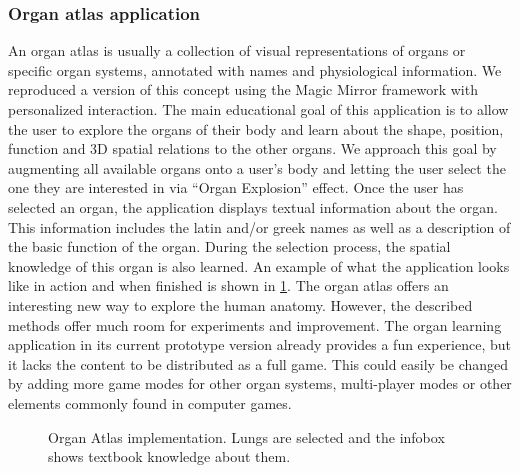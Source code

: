 \subsubsection{Organ atlas application}
An organ atlas is usually a collection of visual representations of organs or specific organ systems, annotated with names and physiological information.
We reproduced a version of this concept using the Magic Mirror framework with personalized interaction. The main educational goal of this application is to allow the user to explore the organs of their body and learn about the shape, position, function and 3D spatial relations to the other organs.
We approach this goal by augmenting all available organs onto a user's body and letting the user select the one they are interested in via ``Organ Explosion'' effect. Once the user has selected an organ, the application displays textual information about the organ. This information includes the latin and/or greek names as well as a description of the basic function of the organ. During the selection process, the spatial knowledge of this organ is also learned. An example of what the application looks like in action and when finished is shown in \figurename{\ref{fig:3-IMR:OrganAtlas}}. The organ atlas offers an interesting new way to explore the human anatomy. However, the described methods offer much room for experiments and improvement. The organ learning application in its current prototype version already provides a fun experience, but it lacks the content to be distributed as a full game. This could easily be changed by adding more game modes for other organ systems, multi-player modes or other elements commonly found in computer games.
\begin{figure}
\centering
{}
\caption{Organ Atlas implementation. Lungs are selected and the infobox shows textbook knowledge about them.}
\label{fig:3-IMR:OrganAtlas}
\end{figure}
